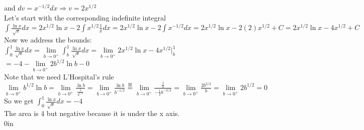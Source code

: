 \begin{exercise}{\Coffeecup \Coffeecup \Coffeecup}
\begin{enumerate}[label=\alph*.)]
{and $dv=x^{-1/2} dx \Rightarrow v = 2x^{1/2}$ \\
Let's start with the corresponding indefinite integral $\int{\frac{\ln{x}}{\sqrt{x}}dx} = 2x^{1/2} \ln{x}-2\int{x^{1/2}\frac{1}{x} dx}= 2x^{1/2} \ln{x}-2\int{x^{-1/2} dx}=2x^{1/2} \ln{x}-2(2)x^{1/2} +C=2x^{1/2}\ln{x}-4x^{1/2}+C$ \\ 
Now we address the bounds: $\int_0^1{\frac{\ln{x}}{\sqrt{x}}dx}= \lim \limits_{b \rightarrow 0^{+}}{\int_b^1 {\frac{\ln{x}}{\sqrt{x}}dx}}=\lim \limits_{b \rightarrow 0^{+}}{2x^{1/2}\ln{x}-4x^{1/2}} \Biggr|_b^1$ \\
$=-4 - \lim \limits_{b \rightarrow 0^{+}}{2b^{1/2}\ln{b}-0}$ \\
Note that we need L'Hospital's rule $\lim \limits_{b \rightarrow 0^{+}}{b^{1/2}\ln{b}}=\lim \limits_{b \rightarrow 0^{+}}{\frac{\ln{b}}{\frac{1}{b^{1/2}}}}=\lim \limits_{b \rightarrow 0^{+}}{\frac{\ln{b}}{b^{-1/2}}}\stackrel{\text{H}}{=}\lim \limits_{b \rightarrow 0^{+}}{\frac{\frac{1}{b}}{-\frac{1}{2} b^{-3/2}}}=\lim \limits_{b \rightarrow 0^{+}}{\frac{2b^{3/2}}{b}} =\lim \limits_{b \rightarrow 0^{+}}{2b^{1/2}} = 0$\\
So we get $\int_{0}^{1}{\frac{\ln{x}}{\sqrt{x}}dx}=-4$\\
The area is 4 but negative because it is under the x axis.
\\ }{0in}
\end{enumerate}
\end{exercise}


